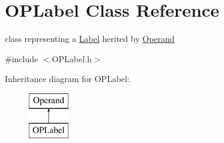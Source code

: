\hypertarget{classOPLabel}{\section{\-O\-P\-Label \-Class \-Reference}
\label{classOPLabel}
}


class representing a \hyperlink{classLabel}{\-Label} herited by \hyperlink{classOperand}{\-Operand}  




{\ttfamily \#include $<$\-O\-P\-Label.\-h$>$}

\-Inheritance diagram for \-O\-P\-Label\-:\begin{figure}[H]
\begin{center}
\leavevmode
\includegraphics[height=2.000000cm]{classOPLabel}
\end{center}
\end{figure}
